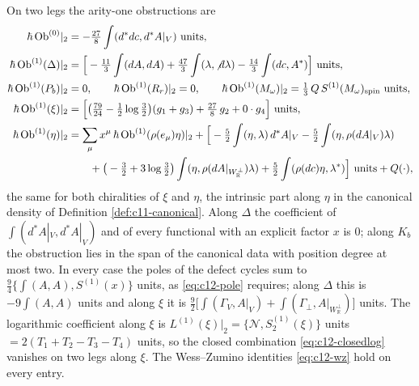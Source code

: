 \begin{theorem}
\label{thm:c12-ob1}
On two legs the arity-one obstructions are
\begin{equation}
\begin{aligned}
\hbar\,\mathrm{Ob}^{(0)}|_2&=-\tfrac{27}8\int(d^*dc,d^*A|_V)\ \text{units},\\
\hbar\,\mathrm{Ob}^{(1)}(\Delta)|_2&=\Big[-\tfrac{11}3\int(dA,dA)+\tfrac{47}3\int(\lambda,{\not d}\lambda)-\tfrac{14}3\int(dc,A^*)\Big]\ \text{units},\\
\hbar\,\mathrm{Ob}^{(1)}(P_b)|_2&=0,\qquad \hbar\,\mathrm{Ob}^{(1)}(R_r)|_2=0,\qquad \hbar\,\mathrm{Ob}^{(1)}(M_\omega)|_2=\tfrac13\,Q\,S^{(1)}(M_\omega)_{\rm spin}\ \text{units},\\
\hbar\,\mathrm{Ob}^{(1)}(\xi)|_2&=\Big[\big(\tfrac{79}{24}-\tfrac12\log\tfrac32\big)(g_1+g_3)+\tfrac{27}8\,g_2+0\cdot g_4\Big]\ \text{units},\\
\hbar\,\mathrm{Ob}^{(1)}(\eta)|_2&=\sum_\mu x^\mu\,\hbar\,\mathrm{Ob}^{(1)}(\rho(e_\mu)\eta)|_2+\Big[-\tfrac52\int(\eta,\lambda)\,d^*A|_V-\tfrac52\int(\eta,\rho(dA|_V)\lambda)\\
&\qquad+\big(-\tfrac32+3\log\tfrac32\big)\int(\eta,\rho(dA|_{W_{\mathbb R}^\perp})\lambda)+\tfrac52\int(\rho(dc)\eta,\lambda^*)\Big]\ \text{units}+Q(\cdot),
\end{aligned}
\label{eq:c12-ob1}
\end{equation}
the same for both chiralities of $\xi$ and $\eta$, the intrinsic part along $\eta$ in the canonical density of Definition \ref{def:c11-canonical}. Along $\Delta$ the coefficient of $\int(d^*A|_V,d^*A|_V)$ and of every functional with an explicit factor $x$ is $0$; along $K_b$ the obstruction lies in the span of the canonical data with position degree at most two. In every case the poles of the defect cycles sum to $\tfrac94\{\int(A,A),S^{(1)}(x)\}$ units, as \eqref{eq:c12-pole} requires; along $\Delta$ this is $-9\int(A,A)$ units and along $\xi$ it is $\tfrac92\big[\int(\Gamma_V,A|_V)+\int(\Gamma_\perp,A|_{W_{\mathbb R}^\perp})\big]$ units. The logarithmic coefficient along $\xi$ is $L^{(1)}(\xi)|_2=\{\mathcal N,S^{(1)}_2(\xi)\}$ units $=2(T_1+T_2-T_3-T_4)$ units, so the closed combination \eqref{eq:c12-closedlog} vanishes on two legs along $\xi$. The Wess--Zumino identities \eqref{eq:c12-wz} hold on every entry.
\end{theorem}

